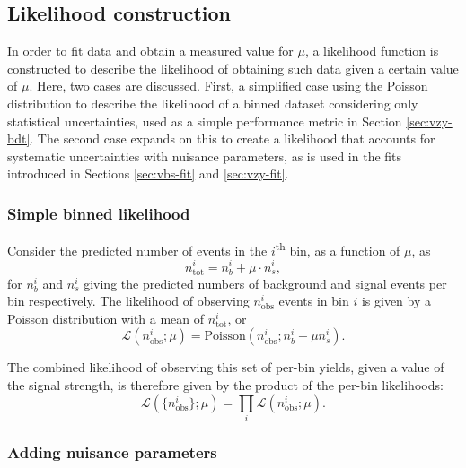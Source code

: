 \subsection{Likelihood construction}
\label{sec:methods-stats-llh}

In order to fit data and obtain a measured value for $\mu$, a likelihood
function is constructed to describe the likelihood of obtaining such data given
a certain value of $\mu$. Here, two cases are discussed. First, a simplified
case using the Poisson distribution to describe the likelihood of a
binned dataset considering only statistical uncertainties, used as a simple
performance metric in Section \ref{sec:vzy-bdt}. The second case expands on this
to create a likelihood that accounts for systematic uncertainties with nuisance
parameters, as is used in the fits introduced in Sections \ref{sec:vbs-fit} and
\ref{sec:vzy-fit}.

\subsubsection{Simple binned likelihood}
\label{sec:methods-stats-llh-simple}

\newcommand\nobsi{\ensuremath{n_\text{obs}^i}\xspace}
Consider the predicted number of events in the $i$\textsuperscript{th} bin,
as a function of $\mu$, as
\begin{equation*}
  n_\text{tot}^i = n_b^i + \mu\cdot n_s^i,
\end{equation*}
for $n_b^i$ and $n_s^i$
giving the predicted numbers of background and signal events per bin
respectively. The likelihood of observing \nobsi events in bin $i$ is
given by a Poisson distribution with a mean of $n_\text{tot}^i$, or
\begin{equation}
  \mathcal{L}(\nobsi;\mu) = \text{Poisson}(\nobsi; n_b^i + \mu n_s^i).
  \label{eqn:methods-stats-llh-perbin}
\end{equation}

The combined likelihood of observing this set of per-bin yields, given a value
of the signal strength, is therefore given by the product of the per-bin
likelihoods:
\begin{equation}
  \mathcal{L}(\{\nobsi\};\mu) = \prod_i \mathcal{L}(\nobsi;\mu).
  \label{eqn:methods-stats-llh-total}
\end{equation}

\subsubsection{Adding nuisance parameters}
\label{sec:methods-stats-llh-nps}

